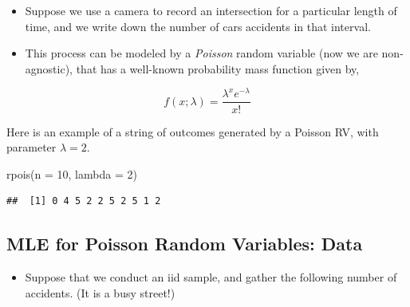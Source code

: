 \documentclass[
]{book}
\newenvironment{Shaded}{\begin{snugshade}}{\end{snugshade}}
\newcommand{\AttributeTok}[1]{\textcolor[rgb]{0.77,0.63,0.00}{#1}}
\newcommand{\DecValTok}[1]{\textcolor[rgb]{0.00,0.00,0.81}{#1}}
\newcommand{\FunctionTok}[1]{\textcolor[rgb]{0.00,0.00,0.00}{#1}}
\newcommand{\NormalTok}[1]{#1}
\providecommand{\tightlist}{%
  \setlength{\itemsep}{0pt}\setlength{\parskip}{0pt}}
\theoremstyle{definition}
\theoremstyle{definition}
\theoremstyle{definition}
\theoremstyle{definition}
\theoremstyle{remark}
\begin{document}
\begin{itemize}
\tightlist
\item
  Suppose we use a camera to record an intersection for a particular length of time, and we write down the number of cars accidents in that interval.\\
\item
  This process can be modeled by a \emph{Poisson} random variable (now we are non-agnostic), that has a well-known probability mass function given by,
\end{itemize}

\[
f(x;\lambda) = \frac{\lambda^x e^{-\lambda}}{x!}
\]

Here is an example of a string of outcomes generated by a Poisson RV, with parameter \(\lambda = 2\).

\begin{Shaded}
\begin{Highlighting}[]
\FunctionTok{rpois}\NormalTok{(}\AttributeTok{n =} \DecValTok{10}\NormalTok{, }\AttributeTok{lambda =} \DecValTok{2}\NormalTok{)}
\end{Highlighting}
\end{Shaded}

\begin{verbatim}
##  [1] 0 4 5 2 2 5 2 5 1 2
\end{verbatim}

\hypertarget{mle-for-poisson-random-variables-data}{%
\subsection{MLE for Poisson Random Variables: Data}\label{mle-for-poisson-random-variables-data}}

\begin{itemize}
\tightlist
\item
  Suppose that we conduct an iid sample, and gather the following number of accidents. (It is a busy street!)
\end{itemize}
\end{document}
